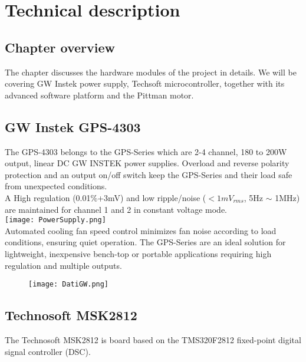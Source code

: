 \documentclass[12pt]{article}
\begin{document}
\section{Technical description}
\subsection{Chapter overview}
The chapter discusses the hardware modules of the project in details. We will be covering GW Instek power supply, Techsoft microcontroller, together with its advanced software platform and the Pittman motor. 

\subsection{GW Instek GPS-4303}

The GPS-4303 belongs to the GPS-Series which are 2-4 channel, 180 to 200W output, linear DC GW INSTEK power supplies. 
Overload and reverse polarity protection and an output on/off switch keep the GPS-Series and their load safe from unexpected conditions.\\
A High regulation (0.01\%+3mV) and low ripple/noise ($< 1mV_{rms}$, 5Hz $\sim$ 1MHz) are maintained for channel 1 and 2 in constant voltage mode.\\

\texttt{[image: PowerSupply.png]}\\[0.7cm]
Automated cooling fan speed control
minimizes fan noise according to load conditions, ensuring quiet operation. The GPS-Series are an
ideal solution for lightweight, inexpensive bench-top or portable applications requiring high regulation
and multiple outputs.

\begin{figure}[h]
\centering
\texttt{[image: DatiGW.png]}
\end{figure}

\subsection{Technosoft MSK2812}

The Technosoft MSK2812 is board based on the TMS320F2812 fixed-point digital signal controller (DSC).\\[0.7cm]
\end{document}

